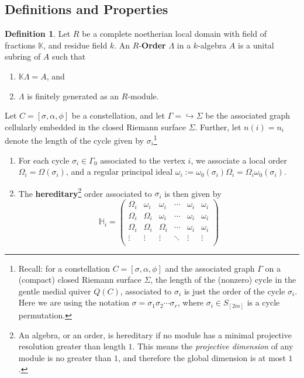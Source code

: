 \documentclass[11pt,oneside]{amsbook}
\numberwithin{equation}{section}
\theoremstyle{plain}
\theoremstyle{definition}
\newtheorem{defn}[theorem]{Definition}
\theoremstyle{remark}
\newcommand{\sidenote}[1]{\footnote{#1}}
\newcommand{\KK}{\mathbb{K}}
\newcommand{\HH}{\mathbb{H}}
\begin{document}
	\subsection{Definitions and Properties}
	\begin{defn}
		Let $R$ be a complete noetherian local domain with field of fractions $\KK$, and residue field $k$. An $R$-\textbf{Order} $\Lambda$ in a $k$-algebra $A$ is a unital subring of $A$ such that
		\begin{enumerate}
			\item $\KK \Lambda = A$, and
			\item $\Lambda$ is finitely generated as an $R$-module. 
		\end{enumerate}
		Let $C = [\sigma, \alpha, \phi]$ be a constellation, and let $\Gamma = \hookrightarrow \Sigma$ be the associated graph cellularly embedded in the closed Riemann surface $\Sigma$. Further, let $n(i)=n_i$ denote the length of the cycle given by $\sigma_i$\sidenote{Recall: for a constellation $C=[\sigma, \alpha, \phi]$ and the associated graph $\Gamma$ on a (compact) closed Riemann surface $\Sigma$, the length of the (nonzero) cycle in the gentle medial quiver $Q(C)$, associated to $\sigma_i$ is just the order of the cycle $\sigma_i$. Here we are using the notation $\sigma = \sigma_1\sigma_2 \cdots \sigma_r$, where $\sigma_i \in S_{[2m]}$ is a cycle permutation.}
		\begin{enumerate}
			\item For each cycle $\sigma_i \in \Gamma_0$ associated to the vertex $i$, we associate a local order $\Omega_i = \Omega(\sigma_i)$, and a regular principal ideal $\omega_i:= \omega_0(\sigma_i) \Omega_i = \Omega_i \omega_0(\sigma_i)$. 
			\item The \textbf{hereditary}\sidenote{An algebra, or an order, is hereditary if no module has a minimal projective resolution greater than length $1$. This means the \textit{projective dimension} of any module is no greater than $1$, and therefore the global dimension is at most $1$.} order associated to $\sigma_i$ is then given by
			\[
			\HH_i = \begin{pmatrix}
				\Omega_i & \omega_i & \omega_i & \cdots & \omega_i & \omega_i \\
				\Omega_i & \Omega_i & \omega_i & \cdots & \omega_i & \omega_i \\
				\Omega_i & \Omega_i & \Omega_i & \cdots & \omega_i & \omega_i \\
				\vdots 	   & \vdots      & \vdots     & \ddots & \vdots    & \vdots \\

\end{pmatrix}\]
\end{enumerate}
\end{defn}
\end{document}
